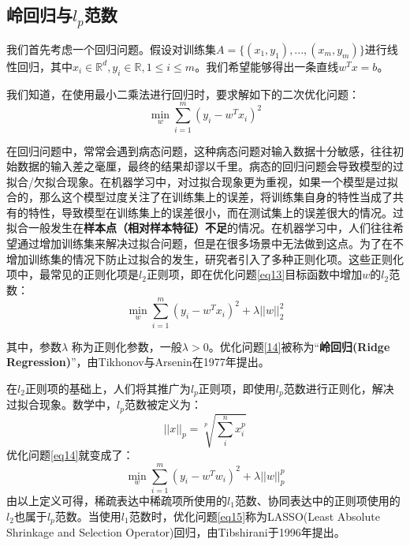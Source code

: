 \documentclass[12pt,a4paper]{article}
\begin{document}
\subsection{岭回归与$l_{p}$范数}
我们首先考虑一个回归问题。假设对训练集$A = \{(x_{1}, y_{1}), ... , (x_{m}, y_{m})\}$进行线性回归，其中$x_{i} \in \mathbb{R}^{d}, y_{i} \in \mathbb{R}, 1 \leq i \leq m$。我们希望能够得出一条直线$w^{T}x = b$。

我们知道，在使用最小二乘法进行回归时，要求解如下的二次优化问题：
\begin{equation}
\label{eq13}
\min_{w} \sum_{i = 1}^{m} (y_{i} - w^{T}x_{i})^2
\end{equation}

在回归问题中，常常会遇到病态问题，这种病态问题对输入数据十分敏感，往往初始数据的输入差之毫厘，最终的结果却谬以千里。病态的回归问题会导致模型的过拟合/欠拟合现象。在机器学习中，对过拟合现象更为重视，如果一个模型是过拟合的，那么这个模型过度关注了在训练集上的误差，将训练集自身的特性当成了共有的特性，导致模型在训练集上的误差很小，而在测试集上的误差很大的情况。过拟合一般发生在\textbf{样本点（相对样本特征）不足}的情况。在机器学习中，人们往往希望通过增加训练集来解决过拟合问题，但是在很多场景中无法做到这点。为了在不增加训练集的情况下防止过拟合的发生，研究者引入了多种正则化项。这些正则化项中，最常见的正则化项是$l_{2}$正则项，即在优化问题\eqref{eq13}目标函数中增加$w$的$l_{2}$范数：
\begin{equation}
\label{eq14}
\min_{w} \sum_{i = 1}^{m} (y_{i} - w^{T}x_{i})^2 + \lambda||w||_{2}^{2}
\end{equation}

其中，参数$\lambda$ 称为正则化参数，一般$\lambda > 0$。优化问题\eqref{14}被称为“\textbf{岭回归(Ridge Regression)}”，由Tikhonov与Arsenin在1977年提出。

在$l_{2}$正则项的基础上，人们将其推广为$l_{p}$正则项，即使用$l_{p}$范数进行正则化，解决过拟合现象。数学中，$l_{p}$范数被定义为：
\begin{equation*}
||x||_{p} = \sqrt[p]{\sum_{i}^{n} x_{i}^{p}}
\end{equation*}
优化问题\eqref{eq14}就变成了：
\begin{equation}
\label{eq15}
\min_{w} \sum_{i = 1}^{m} (y_{i} - w^{T}w_{i})^2 + \lambda||w||_{p}^{p}
\end{equation}
由以上定义可得，稀疏表达中稀疏项所使用的$l_{1}$范数、协同表达中的正则项使用的$l_{2}$也属于$l_{p}$范数。当使用$l_{1}$范数时，优化问题\eqref{eq15}称为LASSO(Least Absolute Shrinkage and Selection Operator)回归，由Tibshirani于1996年提出。
\end{document}
